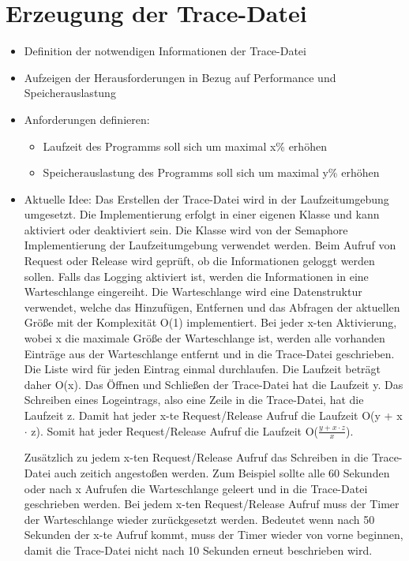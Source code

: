 \section{Erzeugung der Trace-Datei}
\label{section:Erzeugung der Trace-Datei}
\begin{itemize}
    \item Definition der notwendigen Informationen der Trace-Datei
    \item Aufzeigen der Herausforderungen in Bezug auf Performance und
    Speicherauslastung
  \item Anforderungen definieren:
  \begin{itemize}
    \item Laufzeit des Programms soll sich um maximal x\% erhöhen
    \item Speicherauslastung des Programms soll sich um maximal y\% erhöhen
  \end{itemize}
    \item Aktuelle Idee: Das Erstellen der Trace-Datei wird in der
    Laufzeitumgebung umgesetzt. Die Implementierung erfolgt in einer eigenen
    Klasse und kann aktiviert oder deaktiviert sein. Die Klasse wird von der
    Semaphore Implementierung der Laufzeitumgebung verwendet werden. Beim Aufruf
    von Request oder Release wird geprüft, ob die Informationen geloggt werden
    sollen. Falls das Logging aktiviert ist, werden die Informationen in eine
    Warteschlange eingereiht. Die Warteschlange wird eine Datenstruktur
    verwendet, welche das Hinzufügen, Entfernen und das Abfragen der aktuellen
    Größe mit der Komplexität O(1) implementiert. Bei jeder x-ten Aktivierung,
    wobei x die maximale Größe der Warteschlange ist, werden alle vorhanden
    Einträge aus der Warteschlange entfernt und in die Trace-Datei geschrieben.
    Die Liste wird für jeden Eintrag einmal durchlaufen. Die Laufzeit beträgt
    daher O(x). Das Öffnen und Schließen der Trace-Datei hat die Laufzeit y. Das
    Schreiben eines Logeintrags, also eine Zeile in die Trace-Datei, hat die
    Laufzeit z. Damit hat jeder x-te Request/Release Aufruf die Laufzeit O(y + x
    $\cdot$ z). Somit hat jeder Request/Release Aufruf die Laufzeit O($\frac{y +
    x \cdot z}{x}$).

    Zusätzlich zu jedem x-ten Request/Release Aufruf das Schreiben in die
    Trace-Datei auch zeitich angestoßen werden. Zum Beispiel sollte alle 60
    Sekunden oder nach x Aufrufen die Warteschlange geleert und in die
    Trace-Datei geschrieben werden. Bei jedem x-ten Request/Release Aufruf muss
    der Timer der Warteschlange wieder zurückgesetzt werden. Bedeutet wenn nach
    50 Sekunden der x-te Aufruf kommt, muss der Timer wieder von vorne beginnen,
    damit die Trace-Datei nicht nach 10 Sekunden erneut beschrieben wird.


\end{itemize}
